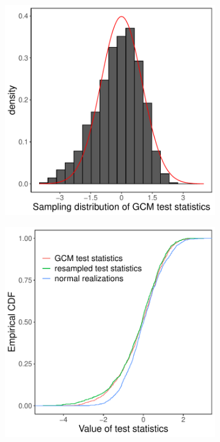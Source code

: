 \documentclass[aos]{imsart}
\theoremstyle{plain}
\theoremstyle{remark}
\begin{document}
\begin{figure}
		\begin{subfigure}[b]{0.49\textwidth}
			\centering
			\includegraphics[width=\linewidth]{Figures/sampled-test-stats.pdf} \\ 
		\end{subfigure}%
		\begin{subfigure}[b]{0.49\textwidth}
			\centering
			\includegraphics[width=\linewidth]{Figures/ecdf_comparison.pdf}

\end{subfigure}
\end{figure}
\end{document}
